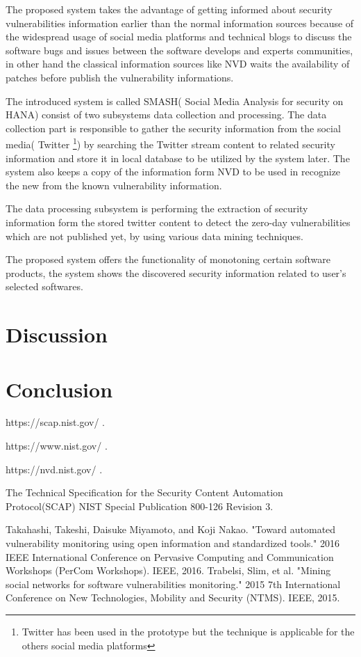 \documentclass{llncs}
\begin{document}
The proposed system takes the advantage of getting informed about security vulnerabilities  information earlier than the normal information sources because of the widespread usage of social media platforms and technical blogs to discuss the software bugs and issues between the software develops and experts communities, in other hand the classical information sources like NVD waits the availability of patches before publish the vulnerability informations.
\par The introduced system is called SMASH( Social Media Analysis for security on HANA) consist of two subsystems data collection and processing. The data collection part is responsible to gather the security information from the social media( Twitter \footnote{Twitter has been used in the prototype but the technique is applicable for the others social media platforms}) by searching the Twitter stream content to related security information and store it in local database to be utilized by the system later. The system also keeps a copy of the information form NVD to be used in recognize the new from the known vulnerability information.
\par
The data processing subsystem is performing the extraction of security information form the stored twitter content to detect the zero-day vulnerabilities which are not published yet, by using various data mining techniques.

The proposed system offers the functionality of monotoning certain software products, the system shows the discovered security information related to user's selected softwares.
  

\section{Discussion}


\section{Conclusion}



\newpage
\begin{thebibliography}{[MT1]}

%

https://scap.nist.gov/ .

https://www.nist.gov/ .

https://nvd.nist.gov/ .



The Technical Specification for the
Security Content Automation Protocol(SCAP)
NIST Special Publication 800-126
Revision 3.


Takahashi, Takeshi, Daisuke Miyamoto, and Koji Nakao. "Toward automated vulnerability monitoring using open information and standardized tools." 2016 IEEE International Conference on Pervasive Computing and Communication Workshops (PerCom Workshops). IEEE, 2016.
Trabelsi, Slim, et al. "Mining social networks for software vulnerabilities monitoring." 2015 7th International Conference on New Technologies, Mobility and Security (NTMS). IEEE, 2015.
%
\end{thebibliography}
\end{document}
